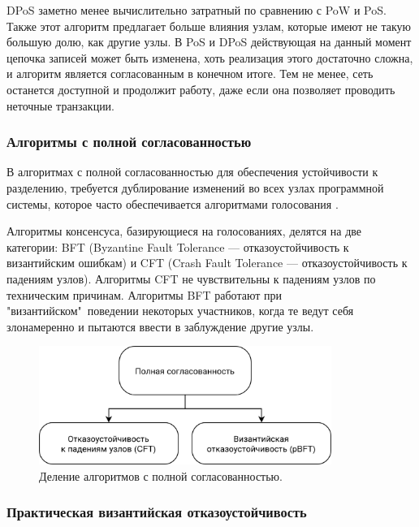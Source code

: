 \documentclass[subf, href, colorlinks=true, 14pt,
times, mtpro, specialist]{disser}
\theoremstyle{definition}
\begin{document}
DPoS заметно менее вычислительно затратный по сравнению с PoW и PoS. Также этот алгоритм предлагает больше влияния узлам, которые имеют не такую большую долю, как другие узлы. В PoS и DPoS действующая на данный момент цепочка записей может быть изменена, хоть реализация этого достаточно сложна, и алгоритм является согласованным в конечном итоге. Тем не менее, сеть останется доступной и продолжит работу, даже если она позволяет проводить неточные транзакции.

\subsubsection{Алгоритмы с полной согласованностью}

В алгоритмах с полной согласованностью для обеспечения устойчивости к разделению, требуется дублирование изменений во всех узлах программной системы, которое часто обеспечивается алгоритмами голосования \cite{Blockvhain_review}.

Алгоритмы консенсуса, базирующиеся на голосованиях, делятся на две категории: BFT (Byzantine Fault Tolerance — отказоустойчивость к византийским ошибкам) и CFT (Crash Fault Tolerance — отказоустойчивость к падениям узлов). Алгоритмы CFT не чувствительны к падениям узлов по техническим причинам. Алгоритмы  BFT работают при "византийском"\ поведении некоторых участников, когда те ведут себя злонамеренно и пытаются ввести в заблуждение другие узлы.

\begin{figure}[H]
\centering
\includegraphics[width=0.85\textwidth]{src/pics/consensus_types_3.png}
\caption{Деление алгоритмов с полной согласованностью.}
\label{fig:consensus_types_3}
\end{figure}

\subsubsection{Практическая византийская отказоустойчивость}
\end{document}
